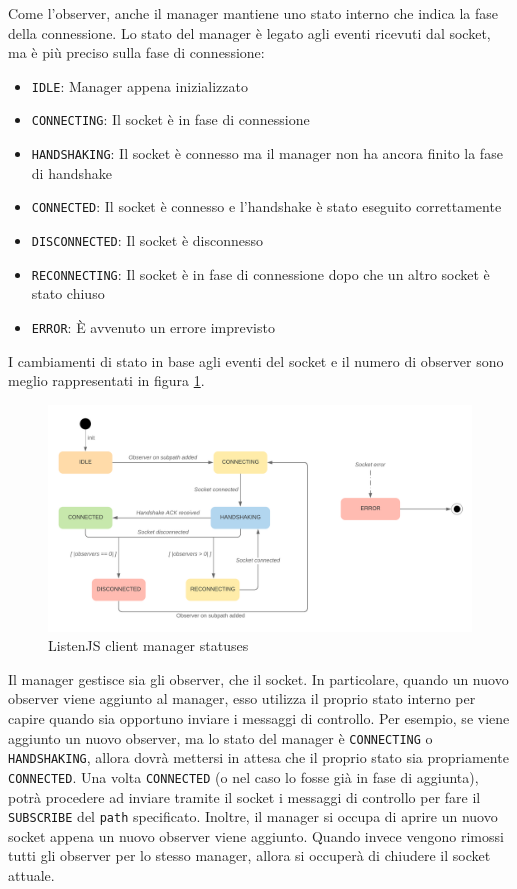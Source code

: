\documentclass[12pt,a4paper,openright,twoside]{report}
\begin{document}
Come l'observer, anche il manager mantiene uno stato interno che indica la fase della connessione. Lo stato del manager è legato agli eventi ricevuti dal socket, ma è più preciso sulla fase di connessione:
\begin{itemize}
\item \lstinline{IDLE}: Manager appena inizializzato
\item \lstinline{CONNECTING}: Il socket è in fase di connessione
\item \lstinline{HANDSHAKING}: Il socket è connesso ma il manager non ha ancora finito la fase di handshake
\item \lstinline{CONNECTED}: Il socket è connesso e l'handshake è stato eseguito correttamente
\item \lstinline{DISCONNECTED}: Il socket è disconnesso
\item \lstinline{RECONNECTING}: Il socket è in fase di connessione dopo che un altro socket è stato chiuso
\item \lstinline{ERROR}: È avvenuto un errore imprevisto
\end{itemize}

I cambiamenti di stato in base agli eventi del socket e il numero di observer sono meglio rappresentati in figura \ref{fig:manager_statuses}.

\begin{figure}[htbp]
\centering
\includegraphics[width=.9\textwidth]{assets/manager_statuses.png}
\caption{ListenJS client manager statuses}
\label{fig:manager_statuses}
\end{figure}

Il manager gestisce sia gli observer, che il socket. 
In particolare, quando un nuovo observer viene aggiunto al manager, esso utilizza il proprio stato interno per capire quando sia opportuno inviare i messaggi di controllo. Per esempio, se viene aggiunto un nuovo observer, ma lo stato del manager è \lstinline{CONNECTING} o \lstinline{HANDSHAKING}, allora dovrà mettersi in attesa che il proprio stato sia propriamente \lstinline{CONNECTED}. Una volta \lstinline{CONNECTED} (o nel caso lo fosse già in fase di aggiunta), potrà procedere ad inviare tramite il socket i messaggi di controllo per fare il \lstinline{SUBSCRIBE} del \lstinline{path} specificato.
Inoltre, il manager si occupa di aprire un nuovo socket appena un nuovo observer viene aggiunto. Quando invece vengono rimossi tutti gli observer per lo stesso manager, allora si occuperà di chiudere il socket attuale.
\end{document}
